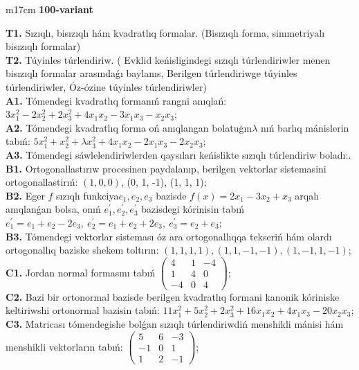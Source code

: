 \documentclass{article}
\begin{document}
\begin{tabular}{m{17cm}}
\textbf{100-variant}
\newline

\textbf{T1.} Sızıqlı, bisızıqlı hám kvadratlıq formalar. (Bisızıqlı forma,  simmetriyalı bisızıqlı formalar)  \\
\textbf{T2.} Túyinles túrlendiriw. ( Evklid keńisligindegi sızıqlı túrlendiriwler menen bisızıqlı formalar arasındaǵı baylanıs, Berilgen túrlendiriwge túyinles túrlendiriwler, Óz-ózine túyinles túrlendiriwler) \\
\textbf{A1.} Tómendegi kvadratlıq formanıń rangni anıqlań: \(3x_{1}^{2} - 2x_{2}^{2} + 2x_{3}^{2} + 4x_{1}x_{2} - 3x_{1}x_{3} - x_{2}x_{3}\); \\
\textbf{A2.} Tómendegi kvadratlıq forma oń anıqlangan bolatuģın\(\lambda\) nıń barlıq mánislerin tabıń: \(5x_{1}^{2} + x_{2}^{2} + \lambda x_{3}^{2} + 4x_{1}x_{2} - 2x_{1}x_{3} - 2x_{2}x_{3}\); \\
\textbf{A3.} Tómendegi sáwlelendiriwlerden qaysıları keńislikte sızıqlı túrlendiriw boladı:. \\
\textbf{B1.} Ortogonallastırıw procesinen paydalanıp, berilgen vektorlar sistemasini ortogonallastirıń: \((1,0,0)\), (0, 1, -1), (1, 1, 1); \\
\textbf{B2.} Eger \(f\) sızıqlı funkciya\(e_{1},e_{2},e_{3}\) bazisde \(f(x) = 2x_{1} - 3x_{2} + x_{3}\) arqalı anıqlanǵan bolsa, onıń \(e_{1}^{'},e_{2}^{'},e_{3}^{'}\) bazisdegi kórinisin tabıń\(e_{1}^{'} = e_{1} + e_{2} - 2e_{3},\ e_{2}^{'} = e_{1} + e_{2} + 2e_{3},\ e_{3}^{'} = e_{2} + e_{3}\); \\
\textbf{B3.} Tómendegi vektorlar sisteması óz ara ortogonallıqqa tekseriń hám olardı ortogonallıq baziske shekem toltırın: \((1,1,1,1),(1,1, - 1, - 1),(1, - 1,1, - 1)\); \\
\textbf{C1.} Jordan normal formasını tabıń \(\begin{pmatrix} 4 & 1 & - 4 \\ 1 & 4 & 0 \\  - 4 & 0 & 4 \end{pmatrix}\); \\
\textbf{C2.} Bazi bir ortonormal bazisde berilgen kvadratlıq formani kanonik kóriniske keltiriwshi ortonormal bazisin tabıń: \(11x_{1}^{2} + 5x_{2}^{2} + 2x_{3}^{2} + 16x_{1}x_{2} + 4x_{1}x_{3} - 20x_{2}x_{3}\); \\
\textbf{C3.} Matricası tómendegishe bolǵan sızıqlı túrlendiriwdiń menshikli mánisi hám menshikli vektorların tabıń: \(\begin{pmatrix} 5 & 6 & - 3 \\  - 1 & 0 & 1 \\ 1 & 2 & - 1 \end{pmatrix}\); \\

\end{tabular}
\vspace{1cm}
\end{document}
